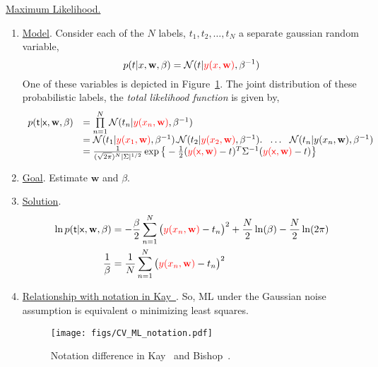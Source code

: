 \begin{enumerate}
{\color{blue}\item \underline{Maximum Likelihood.}}  
\begin{enumerate}
\item \underline{Model}.  Consider each of the $N$ labels, $t_1, t_2, \ldots, t_N$ a separate gaussian random variable,  
\begin{equation}
p(t|x, \mathbf{w}, \beta) = \mathcal{N}(t|{\color{red}y(x,\mathbf{w})}, \beta^{-1})
\end{equation}
One of these variables is depicted in Figure~\ref{fig:curve_fitting}.  The joint distribution of these probabilistic labels, the \emph{total likelihood function} is given by,
\begin{equation}
\begin{array}{lllllllll}
p(\mathsf{t}|\mathsf{x}, \mathbf{w}, \beta) &= \prod\limits_{n=1}^N\mathcal{N}(t_n|{\color{red}y(x_n,\mathbf{w})}, \beta^{-1})\\
&=\mathcal{N}(t_1|{\color{red}y(x_1,\mathbf{w})}, \beta^{-1}).\mathcal{N}(t_2|{\color{red}y(x_2,\mathbf{w})}, \beta^{-1}). \ \ \ldots \ \ \mathcal{N}(t_n|y(x_n,\mathbf{w}), \beta^{-1})\\
&=\frac{1}{(\sqrt{2\pi})^N |\Sigma|^{1/2}}\exp\big\{-\frac{1}{2}({\color{red}y(\mathsf{x},\mathbf{w})}-t)^T\Sigma^{-1}({\color{red}y(\mathsf{x},\mathbf{w})}-t)\big\}
\end{array}
\end{equation}

\item \underline{Goal}.  Estimate $\mathbf{w}$ and $\beta$.
\item \underline{Solution}. 
\begin{align}
\ln p(\mathsf{t}|\mathsf{x}, \mathbf{w}, \beta) &= -\frac{\beta}{2} \sum\limits_{n=1}^N\big({\color{red}y(x_n,\mathbf{w})} - t_n\big)^2 + \frac{N}{2}\ln(\beta) -  \frac{N}{2}\ln(2\pi)\\\notag
\frac{1}{\beta} &= \frac{1}{N} \sum\limits_{n=1}^N\big({\color{red}y(x_n,\mathbf{w})} - t_n\big)^2
\end{align}
\item \underline{Relationship with notation in Kay~\cite{1993_BOOK_SSP_Kay}}.
So, ML under the Gaussian noise assumption is equivalent o minimizing least squares.


								\begin{figure}[t]
								\centering
								\texttt{[image: figs/CV\_ML\_notation.pdf]}
								\caption{Notation difference in Kay~\cite{1993_BOOK_SSP_Kay} and Bishop~\cite{2007_BOOK_PRML_Bishop}.}
								\label{fig:curve_fitting}
								\end{figure}


\end{enumerate}
\end{enumerate}

